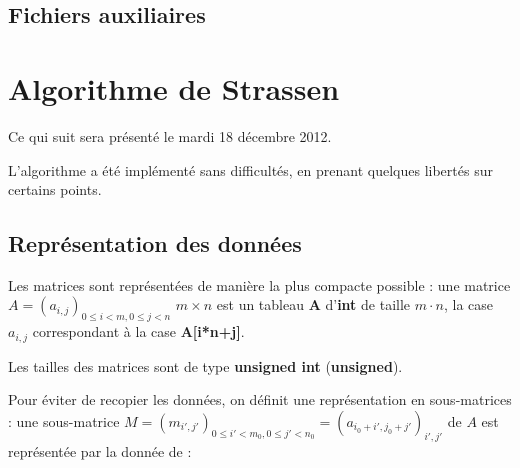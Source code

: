 \documentclass[a4paper]{article}
\begin{document}
\subsection{Fichiers auxiliaires}


\section{Algorithme de Strassen}

Ce qui suit sera présenté le mardi 18 décembre 2012.

L'algorithme a été implémenté sans difficultés, en prenant quelques
libertés sur certains points.

\subsection{Représentation des données}

Les matrices sont représentées de manière la plus compacte possible :
une matrice $A=(a_{i,j})_{0 \leq i < m, 0 \leq j < n}$ $m \times n$ est
un tableau {\bf A} d'{\bf int} de taille $m \cdot n$,
la case $a_{i,j}$ correspondant à la case {\bf A[i*n+j]}.

Les tailles des matrices sont de type {\bf unsigned int} ({\bf unsigned}).

Pour éviter de recopier les données, on définit une représentation en
sous-matrices :
une sous-matrice
$M = (m_{i',j'})_{0 \leq i' < m_0, 0 \leq j' < n_0} =
(a_{i_0+i',j_0+j'})_{i',j'}$
de $A$ est représentée par la donnée de :
\end{document}
